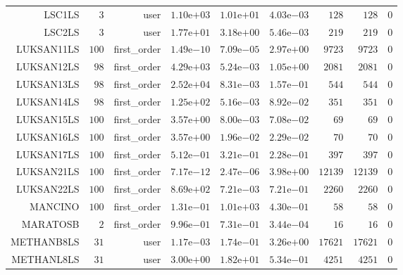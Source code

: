 \begin{longtable}{rrrrrrrrr}
LSC1LS & \(     3\) & user & \( 1.10\)e\(+03\) & \( 1.01\)e\(+01\) & \( 4.03\)e\(-03\) & \(   128\) & \(   128\) & \(     0\) \\
LSC2LS & \(     3\) & user & \( 1.77\)e\(+01\) & \( 3.18\)e\(+00\) & \( 5.46\)e\(-03\) & \(   219\) & \(   219\) & \(     0\) \\
LUKSAN11LS & \(   100\) & first\_order & \( 1.49\)e\(-10\) & \( 7.09\)e\(-05\) & \( 2.97\)e\(+00\) & \(  9723\) & \(  9723\) & \(     0\) \\
LUKSAN12LS & \(    98\) & first\_order & \( 4.29\)e\(+03\) & \( 5.24\)e\(-03\) & \( 1.05\)e\(+00\) & \(  2081\) & \(  2081\) & \(     0\) \\
LUKSAN13LS & \(    98\) & first\_order & \( 2.52\)e\(+04\) & \( 8.31\)e\(-03\) & \( 1.57\)e\(-01\) & \(   544\) & \(   544\) & \(     0\) \\
LUKSAN14LS & \(    98\) & first\_order & \( 1.25\)e\(+02\) & \( 5.16\)e\(-03\) & \( 8.92\)e\(-02\) & \(   351\) & \(   351\) & \(     0\) \\
LUKSAN15LS & \(   100\) & first\_order & \( 3.57\)e\(+00\) & \( 8.00\)e\(-03\) & \( 7.08\)e\(-02\) & \(    69\) & \(    69\) & \(     0\) \\
LUKSAN16LS & \(   100\) & first\_order & \( 3.57\)e\(+00\) & \( 1.96\)e\(-02\) & \( 2.29\)e\(-02\) & \(    70\) & \(    70\) & \(     0\) \\
LUKSAN17LS & \(   100\) & first\_order & \( 5.12\)e\(-01\) & \( 3.21\)e\(-01\) & \( 2.28\)e\(-01\) & \(   397\) & \(   397\) & \(     0\) \\
LUKSAN21LS & \(   100\) & first\_order & \( 7.17\)e\(-12\) & \( 2.47\)e\(-06\) & \( 3.98\)e\(+00\) & \( 12139\) & \( 12139\) & \(     0\) \\
LUKSAN22LS & \(   100\) & first\_order & \( 8.69\)e\(+02\) & \( 7.21\)e\(-03\) & \( 7.21\)e\(-01\) & \(  2260\) & \(  2260\) & \(     0\) \\
MANCINO & \(   100\) & first\_order & \( 1.31\)e\(-01\) & \( 1.01\)e\(+03\) & \( 4.30\)e\(-01\) & \(    58\) & \(    58\) & \(     0\) \\
MARATOSB & \(     2\) & first\_order & \( 9.96\)e\(-01\) & \( 7.31\)e\(-01\) & \( 3.44\)e\(-04\) & \(    16\) & \(    16\) & \(     0\) \\
METHANB8LS & \(    31\) & user & \( 1.17\)e\(-03\) & \( 1.74\)e\(-01\) & \( 3.26\)e\(+00\) & \( 17621\) & \( 17621\) & \(     0\) \\
METHANL8LS & \(    31\) & user & \( 3.00\)e\(+00\) & \( 1.82\)e\(+01\) & \( 5.34\)e\(-01\) & \(  4251\) & \(  4251\) & \(     0\) \\

\end{longtable}
